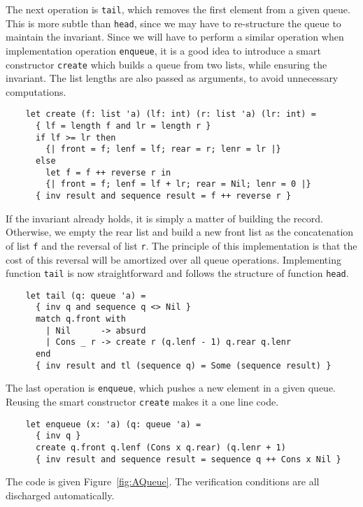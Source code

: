 The next operation is \texttt{tail}, which removes the first element
from a given queue. This is more subtle than \texttt{head}, since we
may have to re-structure the queue to maintain the invariant.
Since we will have to perform a similar operation when implementation
operation \texttt{enqueue}, it is a good idea to introduce a smart
constructor \texttt{create} which builds a queue from two lists, while
ensuring the invariant. The list lengths are also passed as arguments,
to avoid unnecessary computations.
\begin{verbatim}
    let create (f: list 'a) (lf: int) (r: list 'a) (lr: int) =
      { lf = length f and lr = length r }
      if lf >= lr then
        {| front = f; lenf = lf; rear = r; lenr = lr |}
      else
        let f = f ++ reverse r in
        {| front = f; lenf = lf + lr; rear = Nil; lenr = 0 |}
      { inv result and sequence result = f ++ reverse r }
\end{verbatim}
If the invariant already holds, it is simply a matter of building the
record. Otherwise, we empty the rear list and build a new front list
as the concatenation of list \texttt{f} and the reversal of list \texttt{r}.
The principle of this implementation is that the cost of this reversal
will be amortized over all queue operations. Implementing function
\texttt{tail} is now straightforward and follows the structure of
function \texttt{head}.
\begin{verbatim}
    let tail (q: queue 'a) =
      { inv q and sequence q <> Nil }
      match q.front with
        | Nil      -> absurd
        | Cons _ r -> create r (q.lenf - 1) q.rear q.lenr
      end
      { inv result and tl (sequence q) = Some (sequence result) }
\end{verbatim}
The last operation is \texttt{enqueue}, which pushes a new element in
a given queue. Reusing the smart constructor \texttt{create} makes it
a one line code.
\begin{verbatim}
    let enqueue (x: 'a) (q: queue 'a) =
      { inv q }
      create q.front q.lenf (Cons x q.rear) (q.lenr + 1)
      { inv result and sequence result = sequence q ++ Cons x Nil }
\end{verbatim}
The code is given Figure~\ref{fig:AQueue}. The verification conditions
are all discharged automatically.
